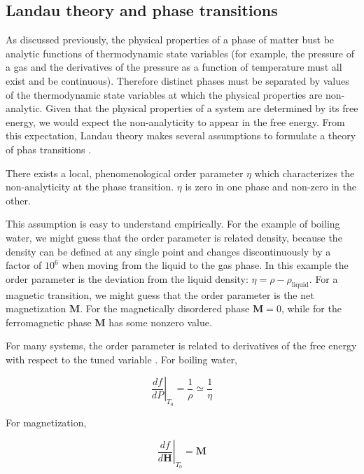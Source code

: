 \subsection{Landau theory and phase transitions}

As discussed previously, the physical properties of a phase of matter bust be analytic functions of thermodynamic state variables (for example, the pressure of a gas and the derivatives of the pressure as a function of temperature must all exist and be continuous). Therefore distinct phases must be separated by values of the thermodynamic state variables at which the physical properties are non-analytic. Given that the physical properties of a system are determined by its free energy, we would expect the non-analyticity to appear in the free energy. From this expectation, Landau theory makes several assumptions to formulate a theory of phas transitions \cite{Landau1969}.

\begin{assumption}
There exists a local, phenomenological order parameter $\eta$ which characterizes the non-analyticity at the phase transition. $\eta$ is zero in one phase and non-zero in the other.
\end{assumption}

This assumption is easy to understand empirically. For the example of boiling water, we might guess that the order parameter is related density, because the density can be defined at any single point and changes discontinuously by a factor of $10^6$ when moving from the liquid to the gas phase. In this example the order parameter is the deviation from the liquid density: $\eta = \rho - \rho_{\text{liquid}}$. For a magnetic transition, we might guess that the order parameter is the net magnetization $\mathbf{M}$. For the magnetically disordered phase $\mathbf{M} = 0$, while for the ferromagnetic phase $\mathbf{M}$ has some nonzero value.

For many systems, the order parameter is related to derivatives of the free energy with respect to the tuned variable \cite{Binder1987}. For boiling water,

\begin{equation}
\left. \frac{df}{dP} \right\vert_{T_{0}} = \frac{1}{\rho} \simeq \frac{1}{\eta}
\end{equation}

For magnetization,

\begin{equation}
\left. \frac{df}{d\mathbf{H}}\right\vert_{T_{0}} = \mathbf{M}
\end{equation}

